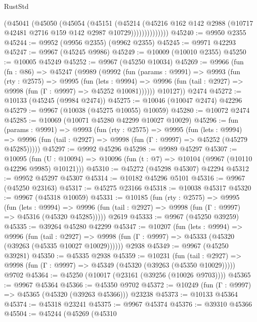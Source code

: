 \begin{lexlean}{RustStd}
\begin{coremodule}
                  (@45041
                    (@45050
                      (@45054
                        (@45151
                          (@45214
                            (@45216
                              @162
                              @142
                              @2988
                              (@10717 @42481 @2716 @159 @142 @2987 @10729))))))))))))))
@45240 := @9950 @2355
@45244 := @9952 (@9956 @2355) (@9962 @2355)
@45245 := @9971 @42293
@45247 := @9967 (@45245 @9986)
@45249 := @10009 (@10010 @2355)
@45250 := @10005 @45249
@45252 := @9967 (@45250 @10034)
@45269 := @9966
    (fun (fn : @86) =>
    @45247
      (@9989
        (@9992
          (fun (params : @9991) =>
          @9993
            (fun (rty : @2575) =>
            @9995
              (fun (lets : @9994) =>
              @9996 (fun (tail : @2927) => @9998 (fun (Γ : @9997) => @45252 @10081))))))
        @10127))
    @2474
@45272 := @10133 (@45245 (@9984 @2474))
@45275 := @10046 (@10047 @2474) @42296
@45279 := @9967 (@10038 (@45275 @10055) @10059)
@45280 := @10072 @2474
@45285 := @10069 (@10071 @45280 @42299 @10027 @10029)
@45296 := fun (params : @9991) =>
  @9993
    (fun (rty : @2575) =>
    @9995
      (fun (lets : @9994) =>
      @9996 (fun (tail : @2927) => @9998 (fun (Γ : @9997) => @45252 (@45279 @45285)))))
@45297 := @9992 @45296
@45298 := @9989 @45297
@45307 := @10095
    (fun (U : @10094) => @10096 (fun (t : @7) => @10104 (@9967 (@10110 @42296 @9985) @10121)))
@45310 := @45272 (@45298 @45307) @42294
@45312 := @9952 @45297 @45307
@45314 := @10182 @45296 @5101
@45316 := @9967 (@45250 @23163)
@45317 := @45275 @23166
@45318 := @10038 @45317
@45320 := @9967 (@45318 @10059)
@45331 := @10185
    (fun (rty : @2575) =>
    @9995
      (fun (lets : @9994) =>
      @9996 (fun (tail : @2927) => @9998 (fun (Γ : @9997) => @45316 (@45320 @45285)))))
    @2619
@45333 := @9967 (@45250 @39259)
@45335 := @39264 @45280 @42299
@45347 := @10207
    (fun (lets : @9994) =>
    @9996
      (fun (tail : @2927) =>
      @9998 (fun (Γ : @9997) => @45333 (@45320 (@39263 (@45335 @10027 @10029))))))
    @2938
@45349 := @9967 (@45250 @39281)
@45350 := @45335 @2938
@45359 := @10231
    (fun (tail : @2927) => @9998 (fun (Γ : @9997) => @45349 (@45320 (@39263 (@45350 @10029)))))
    @9702
@45364 := @45250 (@10017 (@23161 (@39256 (@10026 @9703))))
@45365 := @9967 @45364
@45366 := @45350 @9702
@45372 := @10249 (fun (Γ : @9997) => @45365 (@45320 (@39263 @45366))) @23238
@45373 := @10133 @45364
@45374 := @45318 @23241
@45375 := @9967 @45374
@45376 := @39310 @45366
@45504 := @45244
    (@45269
      (@45310

\end{coremodule}
\end{lexlean}
